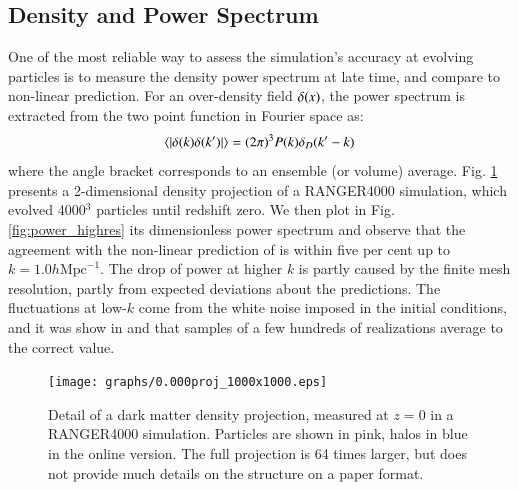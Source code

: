 \documentclass[useAMS,usenatbib]{mn2e}
\begin{document}
 
 \subsection{Density and Power Spectrum}
 \label{subsec:powerspectrum}
 
One of the most reliable way to assess the simulation's accuracy at evolving particles
is to measure the density power spectrum at late time, and compare to non-linear prediction. 
For an over-density field $\delta({\bf \it x})$, the power spectrum is extracted from the two point function in Fourier space as:
\begin{eqnarray}
\langle | \delta ({\bf \it k}) \delta ({\bf \it k'}) | \rangle = (2\pi)^{3}P(k)\delta_{D}({\bf \it k'} - {\bf \it k})
\label{eq:power}
\end{eqnarray}
where the angle bracket corresponds to an ensemble (or volume) average.
Fig. \ref{fig:density} presents  a 2-dimensional density projection of a RANGER4000 simulation, which evolved 4000$^3$ particles until redshift zero.
We then plot in Fig. \ref{fig:power_highres}  its dimensionless power spectrum  and
observe that the agreement with the non-linear prediction of \cite{Lewis:1999bs} is within five per cent up to $k = 1.0 h \mbox{Mpc}^{-1}$.
The drop of power at higher $k$ is partly caused by the finite mesh resolution, partly from expected deviations about the predictions.
The fluctuations at low-$k$ come from the white noise imposed in the initial conditions, and it was show in \citet{2012MNRAS.419.2949N} and 
\citet{2012MNRAS.423.2288H} that
samples of a few hundreds of realizations average to the correct value. 

\begin{figure}%
  \begin{center}
\texttt{[image: graphs/0.000proj\_1000x1000.eps]}
  \caption{Detail of a dark matter density projection, measured at $z=0$ in a RANGER4000 simulation.
  Particles are shown in pink, halos in blue in the online version. The full projection is 64 times larger,
  but does not provide much details on the structure on a paper format.
    \label{fig:density}}
\end{center}
\end{figure}
\end{document}
